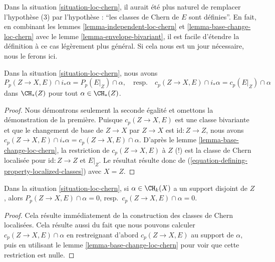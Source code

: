 \begin{remark}
\label{remark-loc-chern}
Dans la situation \ref{situation-loc-chern}, il aurait été plus naturel
de remplacer l'hypothèse (3) par l'hypothèse : ``les classes de Chern
de $E$ sont définies''. En fait, en combinant les
lemmes \ref{lemma-independent-loc-chern} et
\ref{lemma-base-change-loc-chern}
avec le lemme \ref{lemma-envelope-bivariant},
il est facile d'étendre la définition à ce cas légèrement plus général.
Si cela nous est un jour nécessaire, nous le ferons ici.
\end{remark}

\begin{lemma}
\label{lemma-loc-chern-after-pushforward}
Dans la situation \ref{situation-loc-chern}, nous avons
$$
P_p(Z \to X, E) \cap i_*\alpha = P_p(E|_Z) \cap \alpha,
\quad\text{resp.}\quad
c_p(Z \to X, E) \cap i_*\alpha = c_p(E|_Z) \cap \alpha
$$
dans $\CH_*(Z)$ pour tout $\alpha \in \CH_*(Z)$.
\end{lemma}

\begin{proof}
Nous démontrons seulement la seconde égalité et omettons la démonstration de la première.
Puisque $c_p(Z \to X, E)$ est une classe bivariante et que le changement de
base de $Z \to X$ par $Z \to X$ est $\text{id} : Z \to Z$, nous avons
$c_p(Z \to X, E) \cap i_*\alpha = c_p(Z \to X, E) \cap \alpha$.
D'après le lemme \ref{lemma-base-change-loc-chern}, la restriction de
$c_p(Z \to X, E)$ à $Z$ (!) est la classe de Chern localisée pour
$\text{id} : Z \to Z$ et $E|_Z$. Le résultat résulte donc de
(\ref{equation-defining-property-localized-classes}) avec $X = Z$.
\end{proof}

\begin{lemma}
\label{lemma-loc-chern-disjoint}
Dans la situation \ref{situation-loc-chern},
si $\alpha \in \CH_k(X)$ a un support disjoint de $Z$, alors
$P_p(Z \to X, E) \cap \alpha = 0$, resp.\ $c_p(Z \to X, E) \cap \alpha = 0$.
\end{lemma}

\begin{proof}
Cela résulte immédiatement de la construction des classes de Chern localisées.
Cela résulte aussi du fait que nous pouvons calculer
$c_p(Z \to X, E) \cap \alpha$ en restreignant d'abord $c_p(Z \to X, E)$ au
support de $\alpha$, puis en utilisant
le lemme \ref{lemma-base-change-loc-chern}
pour voir que cette restriction est nulle.
\end{proof}

